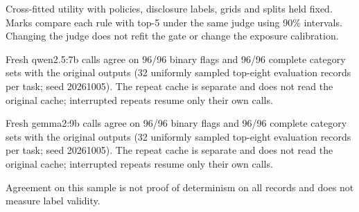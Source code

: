 Cross-fitted utility with policies, disclosure labels, grids and splits held fixed. Marks compare each rule with top-5 under the same judge using 90\% intervals. Changing the judge does not refit the gate or change the exposure calibration.

Fresh qwen2.5:7b calls agree on 96/96 binary flags and 96/96 complete category sets with the original outputs (32 uniformly sampled top-eight evaluation records per task; seed 20261005). The repeat cache is separate and does not read the original cache; interrupted repeats resume only their own calls.

Fresh gemma2:9b calls agree on 96/96 binary flags and 96/96 complete category sets with the original outputs (32 uniformly sampled top-eight evaluation records per task; seed 20261005). The repeat cache is separate and does not read the original cache; interrupted repeats resume only their own calls.

Agreement on this sample is not proof of determinism on all records and does not measure label validity.
